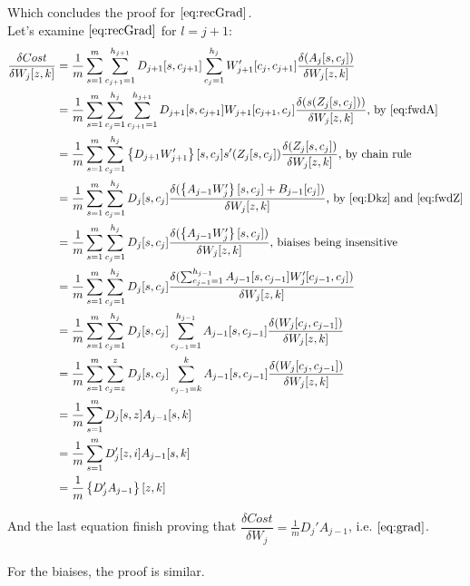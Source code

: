 \documentclass[]{article}
\begin{document}
Which concludes the proof for  $\eqref{eq:recGrad}$.\\

Let's examine $\eqref{eq:recGrad}$ for $l=j+1$:\\

\begin{align*}
\dfrac{\delta Cost}{\delta W_{j}[z,k]}&=\frac{1}{m}\sum_{s=1}^{m}\sum_{c_{j+1}=1}^{h_{j+1}}D_{j+1}[s,c_{j+1}] \sum_{c_{j}=1}^{h_{j}}W_{j+1}' [c_{j},c_{j+1}]\dfrac{\delta (A_{j}[s,c_{j}])}{\delta W_{j}[z,k]}\\
&=\frac{1}{m}\sum_{s=1}^{m} \sum_{c_{j}=1}^{h_{j}}\sum_{c_{j+1}=1}^{h_{j+1}}D_{j+1}[s,c_{j+1}]W_{j+1} [c_{j+1},c_{j}]\dfrac{\delta (s(Z_{j}[s,c_{j}]))}{\delta W_{j}[z,k]} \text{, by $\eqref{eq:fwdA}$}\\
&=\frac{1}{m}\sum_{s=1}^{m} \sum_{c_{j}=1}^{h_{j}} \left\lbrace D_{j+1}W_{j+1}'  \right\rbrace [s,c_{j}] s'(Z_{j}[s,c_{j}])\dfrac{\delta (Z_{j}[s,c_{j}])}{\delta W_{j}[z,k]} \text{, by chain rule}\\
&=\frac{1}{m}\sum_{s=1}^{m} \sum_{c_{j}=1}^{h_{j}} D_{j} [s,c_{j}]\dfrac{\delta ( \left\lbrace A_{j-1}W_{j}' \right\rbrace [s,c_{j}] + B_{j-1}[c_{j}])}{\delta W_{j}[z,k]} \text{, by $\eqref{eq:Dkz}$ and $\eqref{eq:fwdZ}$}\\
&=\frac{1}{m}\sum_{s=1}^{m} \sum_{c_{j}=1}^{h_{j}} D_{j} [s,c_{j}]\dfrac{\delta ( \left\lbrace A_{j-1}W_{j}' \right\rbrace [s,c_{j}] )}{\delta W_{j}[z,k]} \text{, biaises being insensitive}\\
&=\frac{1}{m}\sum_{s=1}^{m} \sum_{c_{j}=1}^{h_{j}} D_{j} [s,c_{j}]\dfrac{\delta (\sum_{c_{j-1}=1}^{h_{j-1}} A_{j-1}[s,c_{j-1}]W_{j}'  [c_{j-1},c_{j}] )}{\delta W_{j}[z,k]}\\
&=\frac{1}{m}\sum_{s=1}^{m} \sum_{c_{j}=1}^{h_{j}} D_{j} [s,c_{j}]\sum_{c_{j-1}=1}^{h_{j-1}} A_{j-1}[s,c_{j-1}] \dfrac{\delta ( W_{j}  [c_{j},c_{j-1}] )}{\delta W_{j}[z,k]}\\
&=\frac{1}{m}\sum_{s=1}^{m} \sum_{c_{j}=z}^{z} D_{j} [s,c_{j}]\sum_{c_{j-1}=k}^{k} A_{j-1}[s,c_{j-1}] \dfrac{\delta ( W_{j}  [c_{j},c_{j-1}] )}{\delta W_{j}[z,k]}\\
&=\frac{1}{m}\sum_{s=1}^{m}  D_{j} [s,z] A_{j-1}[s,k]\\
&=\frac{1}{m}\sum_{s=1}^{m}  D_{j}' [z,i] A_{j-1}[s,k]\\
&=\frac{1}{m} \left\lbrace D_{j}'  A_{j-1}\right\rbrace [z,k]\\
\end{align*}

And the last equation finish proving  that $\dfrac{\delta Cost}{\delta W_{j}}=\frac{1}{m}   D_{j}'  A_{j-1}$, i.e. $\eqref{eq:grad}$.\\
\\
For the biaises, the proof is similar.\\
\end{document}

